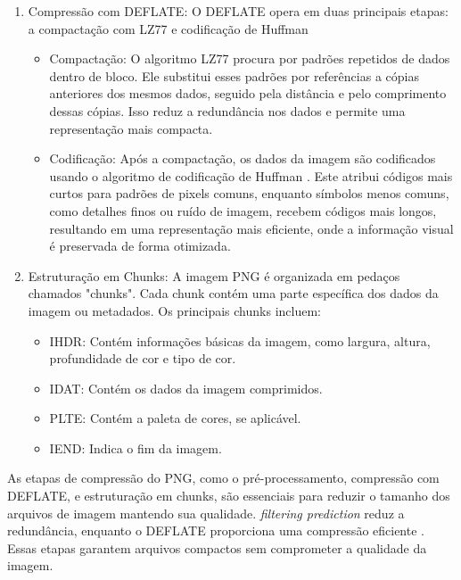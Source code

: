 \begin{enumerate}
    \item Compressão com DEFLATE:
    \BlankLine
    O DEFLATE opera em duas principais etapas: a compactação com \acrshort{LZ77} e codificação de Huffman
    \begin{itemize}
        \item Compactação:
        O algoritmo \acrshort{LZ77} \cite{lempelZivArticle} procura por padrões repetidos de dados dentro de bloco. Ele substitui esses padrões por referências a cópias anteriores dos mesmos dados, seguido pela distância e pelo comprimento dessas cópias. Isso reduz a redundância nos dados e permite uma representação mais compacta.

        \item Codificação:
        Após a compactação, os dados da imagem são codificados usando o algoritmo de codificação de Huffman \cite{huffmanArticle}. Este atribui códigos mais curtos para padrões de pixels comuns, enquanto símbolos menos comuns, como detalhes finos ou ruído de imagem, recebem  códigos mais longos, resultando em uma representação mais eficiente, onde a informação visual é preservada de forma otimizada.
    \end{itemize}

    \item Estruturação em Chunks:
    \BlankLine
    A imagem \acrshort{PNG} é organizada em pedaços chamados "chunks". Cada chunk contém uma parte específica dos dados da imagem ou metadados. Os principais chunks incluem:

    \begin{itemize}
        \item IHDR: Contém informações básicas da imagem, como largura, altura, profundidade de cor e tipo de cor.
        \item IDAT: Contém os dados da imagem comprimidos.
        \item PLTE: Contém a paleta de cores, se aplicável.
        \item IEND: Indica o fim da imagem.
    \end{itemize}
    
\end{enumerate}
\BlankLine

\noindent As etapas de compressão do \acrshort{PNG}, como o pré-processamento, compressão com DEFLATE, e estruturação em chunks, são essenciais para reduzir o tamanho dos arquivos de imagem mantendo sua qualidade. \textit{filtering prediction} reduz a redundância, enquanto o DEFLATE proporciona uma compressão eficiente \cite{digitalImageProcessingGonzalez}. Essas etapas garantem arquivos compactos sem comprometer a qualidade da imagem.

